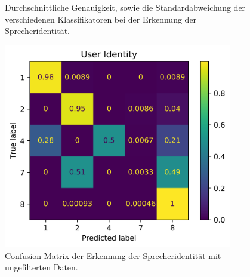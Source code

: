 \begin{figure}[H]
\centering     %
{}
\caption{Durchschnittliche Genauigkeit, sowie die Standardabweichung der verschiedenen Klassifikatoren bei der Erkennung der Sprecheridentität.}
\label{fig:vergleich2}
\end{figure}

\begin{figure}[H]
  \centering
  \includegraphics[width=100mm ,scale=0.6]{AllUserConfMatUnf.png}
  \caption{Confusion-Matrix der Erkennung der Sprecheridentität mit ungefilterten Daten.}
  \label{fig:Usercnf1}
\end{figure}

